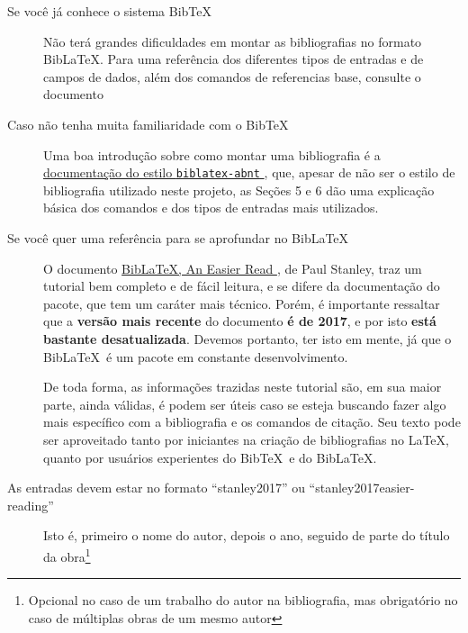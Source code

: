 \begin{description}
	\item [Se você já conhece o sistema Bib\TeX] Não terá grandes dificuldades em montar
	      as bibliografias no formato Bib\LaTeX. Para uma referência dos diferentes tipos de entradas
	      e de campos de dados, além dos comandos de referencias base, consulte o documento

	\item [Caso não tenha muita familiaridade com o Bib\TeX] Uma boa introdução sobre como montar
	      uma bibliografia é a
	      \href{https://linorg.usp.br/CTAN/macros/latex/contrib/biblatex-contrib/biblatex-abnt/doc/biblatex-abnt.pdf}{%
		      documentação do estilo \texttt{biblatex-abnt}%
	      }, que, apesar de não ser o estilo de bibliografia utilizado neste projeto, as Seções
	      5 e 6 dão uma explicação básica dos comandos e dos tipos de entradas mais utilizados.

	\item [Se você quer uma referência para se aprofundar no Bib\LaTeX] O documento
	      \href{https://docs.google.com/viewer?url=https://github.com/PaulStanley/biblatex-tutorial/releases/download/0.2/biblatex-tutorial.pdf}{%
		      Bib\LaTeX, An Easier Read%
	      }, de Paul Stanley, traz um tutorial bem completo e de fácil leitura, e se difere
	      da documentação do pacote, que tem um caráter mais técnico. Porém, é importante
	      ressaltar que a \textbf{versão mais recente} do documento \textbf{é de 2017}, e por isto
	      \textbf{está bastante desatualizada}. Devemos portanto, ter isto em mente, já que
	      o Bib\LaTeX\ é um pacote em constante desenvolvimento.

	      De toda forma, as informações trazidas neste tutorial são, em sua maior
	      parte, ainda válidas, é podem ser úteis caso se esteja buscando fazer
	      algo mais específico com a bibliografia e os comandos de citação. Seu texto pode
        ser aproveitado tanto por iniciantes na criação de bibliografias no \LaTeX, quanto
        por usuários experientes do Bib\TeX\ e do Bib\LaTeX.

  \item [As entradas devem estar no formato \enquote{stanley2017} ou 
        \enquote{stanley2017easier-reading}] Isto é, primeiro o nome do autor, depois o ano,
        seguido de parte do título da obra\footnote{%
          Opcional no caso de um trabalho do autor na bibliografia, mas 
          obrigatório no caso de múltiplas obras de um mesmo autor
        }


\end{description}
